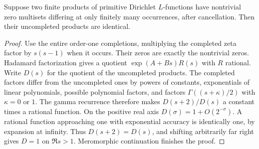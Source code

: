 \documentclass[11pt,letterpaper]{article}
\theoremstyle{plain}
\theoremstyle{definition}\newtheorem{example}[theorem]{Example}
\begin{document}
\begin{lemma}\label{finite}
Suppose two finite products of primitive Dirichlet $L$-functions have nontrivial zero multisets differing at only finitely many occurrences, after cancellation. Then their uncompleted products are identical.
\end{lemma}
\begin{proof}
Use the entire order-one completions, multiplying the completed zeta factor by $s(s-1)$ when it occurs. Their zeros are exactly the nontrivial zeros. Hadamard factorization gives a quotient $\exp(A+Bs)R(s)$ with $R$ rational. Write $D(s)$ for the quotient of the uncompleted products. The completed factors differ from the uncompleted ones by powers of constants, exponentials of linear polynomials, possible polynomial factors, and factors $\Gamma((s+\kappa)/2)$ with $\kappa=0$ or $1$. The gamma recurrence therefore makes $D(s+2)/D(s)$ a constant times a rational function. On the positive real axis $D(\sigma)=1+O(2^{-\sigma})$. A rational function approaching one with exponential accuracy is identically one, by expansion at infinity. Thus $D(s+2)=D(s)$, and shifting arbitrarily far right gives $D=1$ on $\Re s>1$. Meromorphic continuation finishes the proof.
\end{proof}
\end{document}
